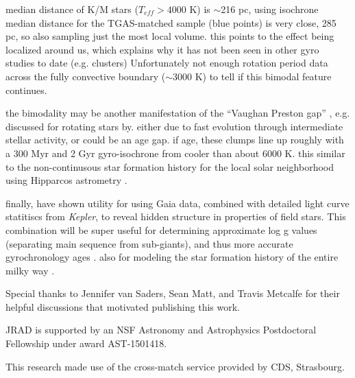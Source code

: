 \documentclass[manuscript, letterpaper]{aastex6}
\newcommand{\Kepler}{\textsl{Kepler}\xspace}
\begin{document}
median distance of K/M stars ($T_{eff} > 4000$ K) is $\sim$216 pc, using isochrone
median distance for the TGAS-matched sample (blue points) is very close, 285 pc, so also sampling just the most local volume.
this points to the effect being localized around us, which explains why it has not been seen in other gyro studies to date (e.g. clusters)
Unfortunately not enough rotation period data across the fully convective boundary ($\sim$3000 K) to tell if this bimodal feature continues.



the bimodality may be another manifestation of the ``Vaughan Preston gap'' \citep{vaughan1980}, e.g. discussed for rotating stars by\citet{kado-fong2016}.
either due to fast evolution through intermediate stellar activity, or could be an age gap. if age, these clumps line up roughly with a 300 Myr and 2 Gyr \citet{meibom2011} gyro-isochrone from cooler than about 6000 K. this similar to the non-continusous star formation history for the local solar neighborhood using Hipparcos astrometry \citep{hernandez2000}. 

finally, %
have shown utility for using Gaia data, combined with detailed light curve statitiscs from \Kepler, to reveal hidden structure in properties of field stars. This combination will be super useful for determining approximate log g values (separating main sequence from sub-giants), and thus more accurate gyrochronology ages \citep{van-saders2013}. also for modeling the star formation history of the entire milky way \citep[e.g.][]{bertelli1999}.



\acknowledgments
Special thanks to Jennifer van Saders, Sean Matt, and Travis Metcalfe for their helpful discussions that motivated publishing this work.

JRAD is supported by an NSF Astronomy and Astrophysics Postdoctoral Fellowship under award AST-1501418.

This research made use of the cross-match service provided by CDS, Strasbourg.


\end{document}
